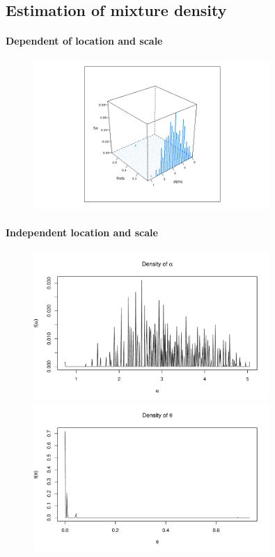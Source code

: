\subsection{Estimation of mixture density}
\paragraph{Dependent of location and scale}
\begin{figure}
    \centering
    \includegraphics[width=0.8\textwidth]{../../Figures/2016-2022/WGLVmix.png}
\end{figure}

\paragraph{Independent location and scale}
\begin{figure}
    \centering
    \includegraphics[width=0.8\textwidth]{../../Figures/2016-2022/WTLVmix_u.pdf}
    \includegraphics[width=0.8\textwidth]{../../Figures/2016-2022/WTLVmix_v.pdf}
\end{figure}

